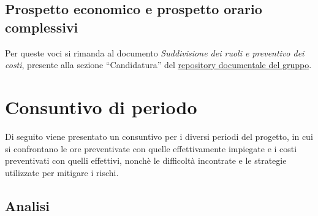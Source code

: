 \subsection{Prospetto economico e prospetto orario complessivi}\label{sec:preventivo:totale}
Per queste voci si rimanda al documento \textit{Suddivisione dei ruoli e preventivo dei  costi}, presente alla sezione ``Candidatura'' del \href{https://avant-garde-software-engineering.github.io/documentazione.html}{repository documentale del gruppo}.



\newpage
\section{Consuntivo di periodo}\label{sec:consuntivo}

Di seguito viene presentato un consuntivo per i diversi periodi del progetto, in cui si confrontano le ore preventivate con quelle effettivamente impiegate e i costi preventivati con quelli effettivi, nonchè le difficoltà incontrate e le strategie utilizzate per mitigare i rischi.\\

\subsection{Analisi}\label{sec:consuntivo:analisi}

